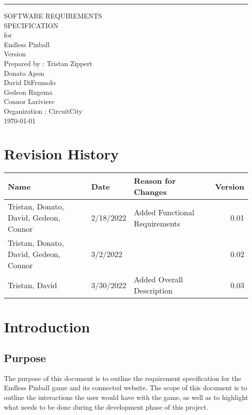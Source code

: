 \documentclass[11pt]{article}
\date{}
\title{}
\begin{document}
\begin{flushright}
    \rule{16cm}{5pt}\vskip1cm
    \begin{bfseries}
        \Huge{SOFTWARE REQUIREMENTS\\ SPECIFICATION}\\
        \vspace{1.5cm}
        for\\
        \vspace{1.5cm}
        Endless Pinball\\
        \vspace{1.5cm}
        \LARGE{Version \myversion}\\
        \vspace{1.5cm}
        Prepared by : Tristan Zippert\\
    Donato Apon \\
     David DiFrumolo\\
       Gedeon Rugema\\
    Connor Lariviere\\ 
        \vspace{1.5cm}
        Organization : CircuitCity\\
        \vspace{1.5cm}
        \today\\
    \clearpage
    \end{bfseries}
\end{flushright}
\tableofcontents
\section*{Revision History}
\label{sec:org5a117c9}
\begin{center}
\begin{tabular}{lllr}
Name & Date & Reason for Changes & Version\\
\hline
Tristan, Donato, David, Gedeon, Connor & 2/18/2022 & Added Functional Requirements & 0.01\\
Tristan, Donato, David, Gedeon, Connor & 3/2/2022 &  & 0.02\\
Tristan, David & 3/30/2022 & Added Overall Description & 0.03\\
\end{tabular}
\end{center}

\section{Introduction}
\label{sec:orgfd32af1}
\subsection{Purpose}
\label{sec:orgffff930}
The purpose of this document is to outline the requirement specification for the Endless Pinball game and its connected website. The scope of this document is to outline the interactions the user would have with the game, as well as to highlight what needs to be done during the development phase of this project. 
\end{document}

